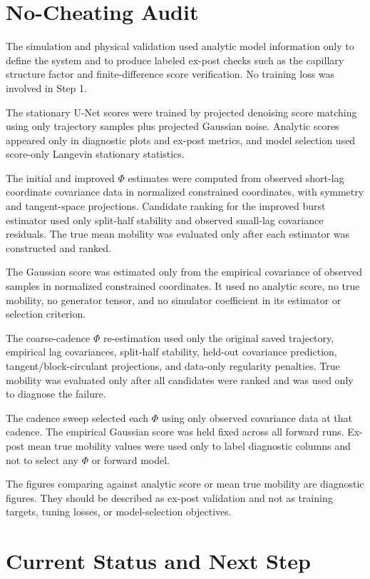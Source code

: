 \documentclass[11pt]{article}
\begin{document}
\section{No-Cheating Audit}

The simulation and physical validation used analytic model information only to define the system and to produce labeled ex-post checks such as the capillary structure factor and finite-difference score verification.  No training loss was involved in Step 1.

The stationary U-Net scores were trained by projected denoising score matching using only trajectory samples plus projected Gaussian noise.  Analytic scores appeared only in diagnostic plots and ex-post metrics, and model selection used score-only Langevin stationary statistics.

The initial and improved \(\Phi\) estimates were computed from observed short-lag coordinate covariance data in normalized constrained coordinates, with symmetry and tangent-space projections.  Candidate ranking for the improved burst estimator used only split-half stability and observed small-lag covariance residuals.  The true mean mobility was evaluated only after each estimator was constructed and ranked.

The Gaussian score was estimated only from the empirical covariance of observed samples in normalized constrained coordinates.  It used no analytic score, no true mobility, no generator tensor, and no simulator coefficient in its estimator or selection criterion.

The coarse-cadence \(\Phi\) re-estimation used only the original saved trajectory, empirical lag covariances, split-half stability, held-out covariance prediction, tangent/block-circulant projections, and data-only regularity penalties.  True mobility was evaluated only after all candidates were ranked and was used only to diagnose the failure.

The cadence sweep selected each \(\Phi\) using only observed covariance data at that cadence.  The empirical Gaussian score was held fixed across all forward runs.  Ex-post mean true mobility values were used only to label diagnostic columns and not to select any \(\Phi\) or forward model.

The figures comparing against analytic score or mean true mobility are diagnostic figures.  They should be described as ex-post validation and not as training targets, tuning losses, or model-selection objectives.

\section{Current Status and Next Step}
\end{document}
